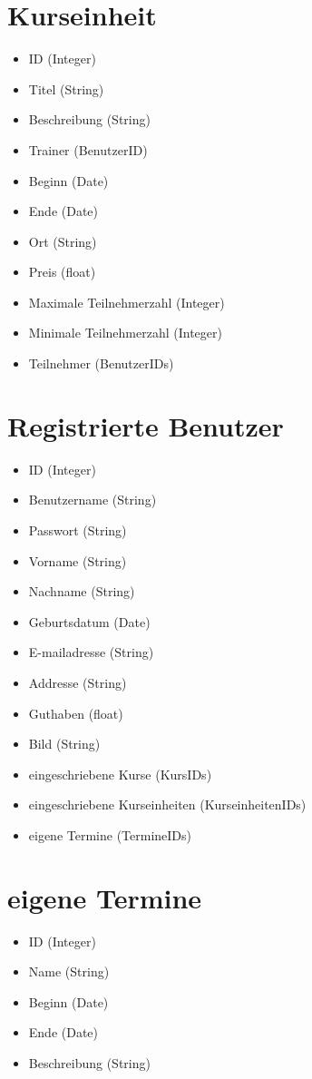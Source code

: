 \documentclass[a4paper]{scrreprt}
\newcounter{Lc}
\newcounter{Hc}
\newcommand{\stepHc}{\stepcounter{Hc}\setcounter{Lc}{0}}
\begin{document}
	\section{Kurseinheit}
	 \Func {} 
	 \begin{itemize}
	 	\item ID (Integer)
	 	\item Titel (String)
	 	\item Beschreibung (String)
	 	\item Trainer (BenutzerID)
	 	\item Beginn (Date)
	 	\item Ende (Date)
	 	\item Ort (String)
	 	\item Preis (float)
	 	\item Maximale Teilnehmerzahl (Integer)
	 	\item Minimale Teilnehmerzahl (Integer)
	 	\item Teilnehmer (BenutzerIDs)
	 \end{itemize}   
    
    
\stepHc	   		
    \section{Registrierte Benutzer}
		  \Func {} 
		  \begin{itemize}
		  	\item ID (Integer)
		  	\item Benutzername (String)
		  	\item Passwort (String)
		  	\item Vorname (String)
		  	\item Nachname (String)
		  	\item Geburtsdatum (Date)
		  	\item E-mailadresse (String)
		  	\item Addresse (String)
		  	\item Guthaben (float)
		  	\item Bild (String)
		  	\item eingeschriebene Kurse (KursIDs)
		  	\item eingeschriebene Kurseinheiten (KurseinheitenIDs)
		  	\item eigene Termine (TermineIDs)
		  \end{itemize}

\stepHc		    
	  \section{eigene Termine}
	    \Func {} 
	    \begin{itemize}
	    	\item ID (Integer)
	    	\item Name (String)
	    	\item Beginn (Date)
	    	\item Ende (Date)
	    	\item Beschreibung (String)
	    \end{itemize}
	   
\end{document}
